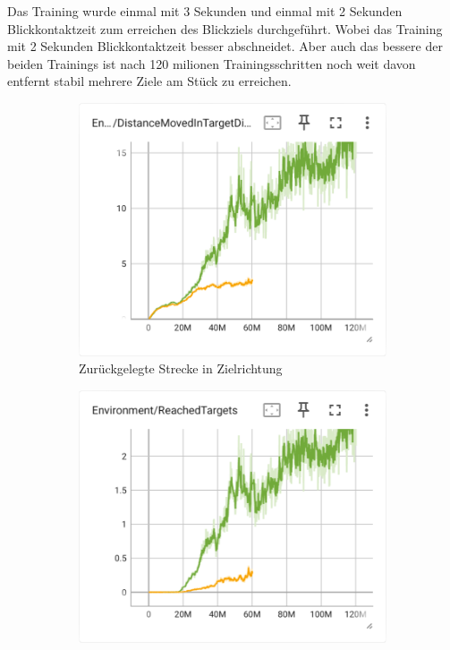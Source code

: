 Das Training wurde einmal mit 3 Sekunden und einmal mit 2 Sekunden Blickkontaktzeit zum erreichen des Blickziels durchgeführt. Wobei das Training mit 2 Sekunden Blickkontaktzeit besser abschneidet. Aber auch das bessere der beiden Trainings ist nach 120 milionen Trainingsschritten noch weit davon entfernt stabil mehrere Ziele am Stück zu erreichen.

\begin{figure}[H]
  \centering  
    \begin{subfigure}{.49\textwidth}
      \centering  
      \includegraphics[width=\textwidth]{img/117_119_move_target_dir}
      \caption{Zurückgelegte Strecke in Zielrichtung}
      \label{fig:117_119_move_target_dir}
    \end{subfigure}
    \begin{subfigure}{.49\textwidth}
      \centering  
      \includegraphics[width=\textwidth]{img/117_119_reach_target}

\end{subfigure}
\end{figure}
